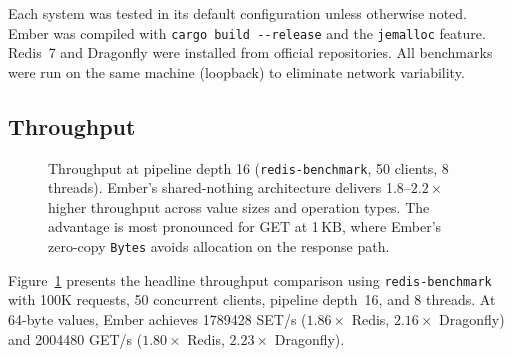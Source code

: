 \documentclass[conference]{IEEEtran}
\begin{document}
Each system was tested in its default configuration unless otherwise
noted. Ember was compiled with \texttt{cargo build -{}-release} and
the \texttt{jemalloc} feature. Redis~7 and Dragonfly were installed
from official repositories. All benchmarks were run on the same
machine (loopback) to eliminate network variability.

\subsection{Throughput}

\begin{figure}[t]
\centering
{}
\caption{Throughput at pipeline depth 16 (\texttt{redis-benchmark},
50 clients, 8 threads). Ember's shared-nothing architecture delivers
1.8--$2.2\times$ higher throughput across value sizes and operation
types. The advantage is most pronounced for GET at 1\,KB, where
Ember's zero-copy \texttt{Bytes} avoids allocation on the response
path.}
\label{fig:throughput}
\end{figure}

Figure~\ref{fig:throughput} presents the headline throughput
comparison using \texttt{redis-benchmark} with 100K requests, 50
concurrent clients, pipeline depth~16, and 8 threads. At 64-byte
values, Ember achieves \num{1789428} SET/s ($1.86\times$ Redis,
$2.16\times$ Dragonfly) and \num{2004480} GET/s ($1.80\times$ Redis,
$2.23\times$ Dragonfly).
\end{document}
